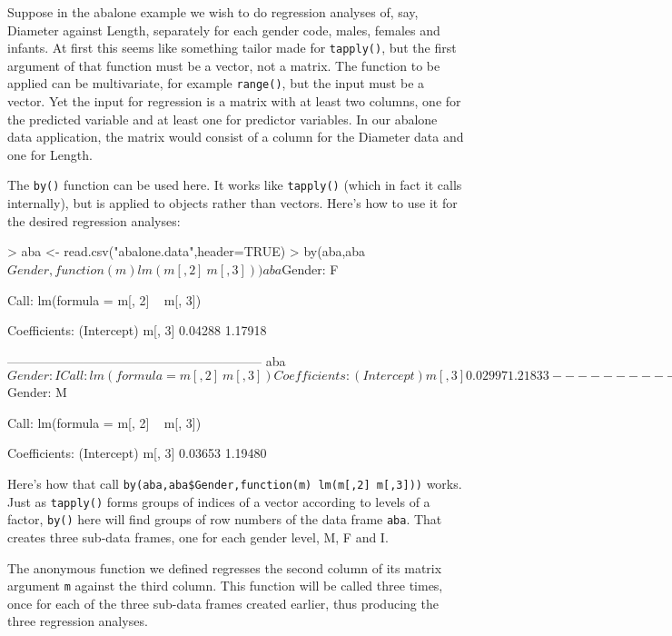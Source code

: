 Suppose in the abalone example we wish to do regression analyses of,
say, Diameter against Length, separately for each gender code, males,
females and infants.  At first this seems like something tailor made for
{\tt tapply()}, but the first argument of that function must be a
vector, not a matrix.  The function to be applied can be multivariate,
for example {\tt range()}, but the input must be a vector.  Yet the
input for regression is a matrix with at least two columns, one for the
predicted variable and at least one for predictor variables.  In our
abalone data application, the matrix would consist of a column for the
Diameter data and one for Length.  

The {\tt by()} function can be used here.  It works like {\tt tapply()}
(which in fact it calls internally), but is applied to objects rather
than vectors.  Here's how to use it for the desired regression analyses:

\begin{Code}
> aba <- read.csv("abalone.data",header=TRUE)
> by(aba,aba$Gender,function(m) lm(m[,2]~m[,3]))
aba$Gender: F

Call:
lm(formula = m[, 2] ~ m[, 3])

Coefficients:
(Intercept)       m[, 3]  
    0.04288      1.17918  

------------------------------------------------------------ 
aba$Gender: I

Call:
lm(formula = m[, 2] ~ m[, 3])

Coefficients:
(Intercept)       m[, 3]  
    0.02997      1.21833  

------------------------------------------------------------ 
aba$Gender: M

Call:
lm(formula = m[, 2] ~ m[, 3])

Coefficients:
(Intercept)       m[, 3]  
    0.03653      1.19480  
\end{Code}

Here's how that call {\tt by(aba,aba\$Gender,function(m)
lm(m[,2]~m[,3]))} works.  Just as {\tt tapply()} forms groups of indices
of a vector according to levels of a factor, {\tt by()} here will find
groups of row numbers of the data frame {\tt aba}.  That creates three 
sub-data frames, one for each gender level, M, F and I.  

The anonymous function we defined regresses the second column of its
matrix argument {\tt m} against the third column.  This function will be
called three times, once for each of the three sub-data frames created
earlier, thus producing the three regression analyses.

